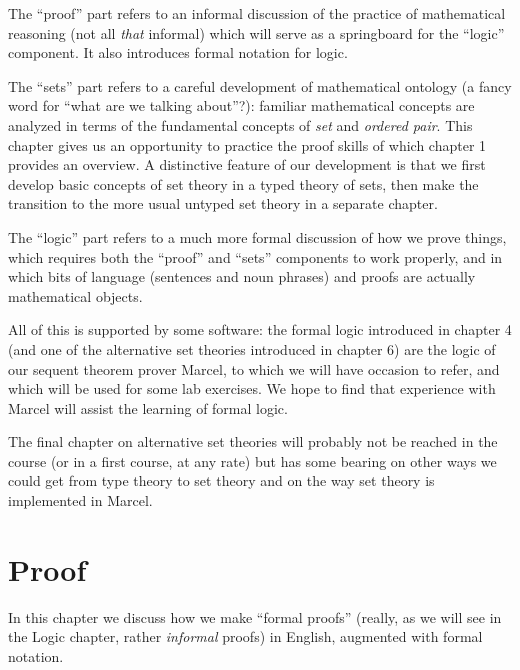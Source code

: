 \documentclass[12pt]{book}
\begin{document}
The ``proof'' part refers to an informal discussion of the practice of mathematical reasoning (not all {\em that\/} informal) which will serve as a
springboard for the ``logic'' component.  It also introduces formal
notation for logic.

The ``sets'' part refers to a careful development of mathematical
ontology (a fancy word for ``what are we talking about''?): familiar
mathematical concepts are analyzed in terms of the fundamental concepts 
of {\em set\/} and {\em ordered pair\/}.  This chapter gives us an opportunity to practice
the proof skills of which chapter 1 provides an overview.  A
distinctive feature of our development is that we first develop basic
concepts of set theory in a typed theory of sets, then make the
transition to the more usual untyped set theory in a separate chapter.

The ``logic'' part refers to a much more formal discussion of how we
prove things, which requires both the ``proof'' and ``sets''
components to work properly, and in which bits of language (sentences
and noun phrases) and proofs are actually mathematical objects.

All of this is supported by some software: the formal logic introduced
in chapter 4  (and one of the alternative set theories introduced in
chapter 6) are the logic of our sequent theorem prover Marcel, to
which we will have occasion to refer, and which will be used for some
lab exercises.  We hope to find that experience with Marcel will
assist the learning of formal logic.

The final chapter on alternative set theories will probably not be
reached in the course (or in a first course, at any rate) but has some bearing on other ways we could get
from type theory to set theory and on the way set theory is
implemented in Marcel.

\newpage

\chapter{Proof}

In this chapter we discuss how we make ``formal proofs'' (really, as
we will see in the Logic chapter, rather {\em informal\/} proofs) in
English, augmented with formal notation.
\end{document}
